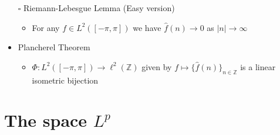 \documentclass[12pt]{article}
\newcommand{\sq}{$\square$}
\begin{document}
\begin{itemize}
    \item[\sq]Riemann-Lebesgue Lemma (Easy version)
    \begin{itemize}
        \item For any $f\in L^2([-\pi, \pi])$ we have $\hat{f}(n)\rightarrow 0$ as $|n|\rightarrow \infty$
    \end{itemize} 
    \item Plancherel Theorem
    \begin{itemize}
        \item $\Phi : L^2([-\pi, \pi])\rightarrow \ell^2(\mathbb{Z})$ given by $f\mapsto \{\hat{f}(n)\}_{n\in \mathbb{Z}}$ is a linear isometric bijection
    \end{itemize} 
\end{itemize}
\bigskip

\section{The space $L^p$}
\smallskip
\end{document}
